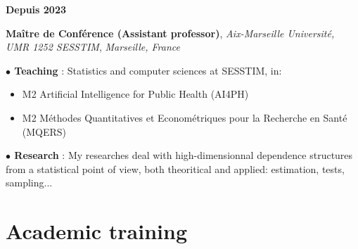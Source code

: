 \documentclass[a4paper,11pt]{article}
\newcommand{\tabcv}[2]{
\begin{minipage}[t]{0.12\linewidth}
\textbf{\footnotesize #1}
\end{minipage}\hfill
\begin{minipage}[t]{0.85\linewidth}
#2
\end{minipage}
\vspace{1em}
}
\begin{document}
\begin{flushleft}
\tabcv{Depuis 2023}{
\textbf{Maître de Conférence (Assistant professor)}, \textit{Aix-Marseille Université, UMR 1252 SESSTIM}, \textit{Marseille, France}\\[0.5em]
{\footnotesize
\textbf{$\bullet$ Teaching} : Statistics and computer sciences at SESSTIM, in:
\begin{itemize}
  \item M2 Artificial Intelligence for Public Health (AI4PH)
  \item M2 Méthodes Quantitatives et Econométriques pour la Recherche en Santé (MQERS)
\end{itemize}
\textbf{$\bullet$ Research} : My researches deal with high-dimensionnal dependence structures from a statistical point of view, both theoritical and applied: estimation, tests, sampling...
}
}

\section{Academic training}\label{subsec:formation_academique}


\end{flushleft}
\end{document}
